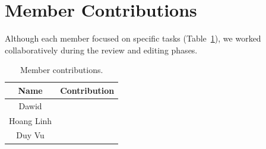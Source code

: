 \section{Member Contributions}
Although each member focused on specific tasks (Table~\ref{tab:member_contributions}), we worked collaboratively during the review and editing phases.

\begin{table}[h]
\centering
\caption{Member contributions.}
\label{tab:member_contributions}
\begin{tabularx}{\textwidth}{cX}
\hline
\textbf{Name} & \textbf{Contribution} \\
\hline
Dawid & \\ 
Hoang Linh &  \\ 
Duy Vu & \\
\hline
\end{tabularx}
\end{table}
